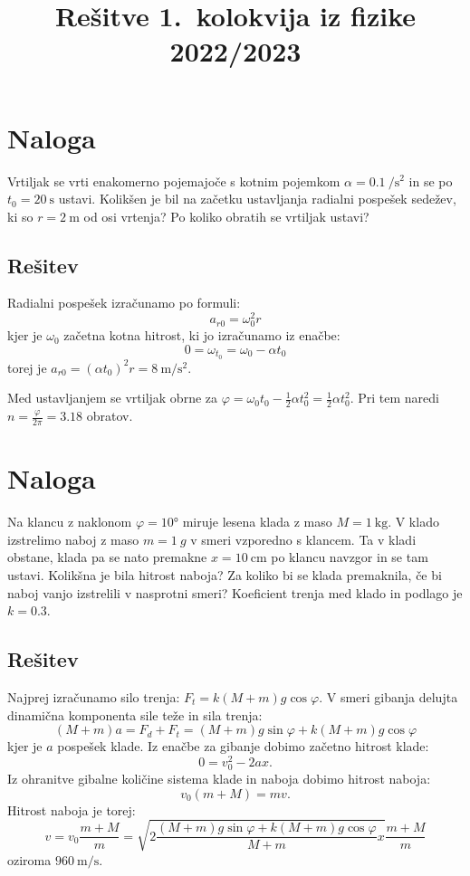 \documentclass[a4,11pt]{article}
\title{Rešitve 1.~kolokvija iz fizike 2022/2023}
\author{}
\date{}
\begin{document}
\maketitle

\section{Naloga}
    Vrtiljak se vrti enakomerno pojemajoče s kotnim pojemkom \(\alpha = \qty{0.1}{\per\s\squared}\)
    in se po \(t_0 = \qty{20}{\s}\) ustavi.
    Kolikšen je bil na začetku ustavljanja radialni pospešek sedežev, ki so \(r = \qty{2}{\m}\) od osi vrtenja?
    Po koliko obratih se vrtiljak ustavi?

\subsection*{Rešitev}
    Radialni pospešek izračunamo po formuli:
    \[a_{r0} = \omega_0^2 r\]
    kjer je \(\omega_0\) začetna kotna hitrost, ki jo izračunamo iz enačbe:
    \[0 = \omega_{t_0} = \omega_0 - \alpha t_0\]
    torej je \(a_{r0} = {\left(\alpha t_0\right)}^2 r = \qty{8}{\m\per\s\squared}\).

    Med ustavljanjem se vrtiljak obrne za \(\varphi = \omega_0 t_0 - \frac{1}{2}\alpha t_0^2 = \frac{1}{2}\alpha t_0^2\).
    Pri tem naredi \(n = \frac{\varphi}{2\pi} = 3.18\) obratov.

\section{Naloga}
    Na klancu z naklonom \(\varphi = \ang{10}\) miruje lesena klada z maso \(M = \qty{1}{\kg}\). V klado izstrelimo naboj z maso
    \(m = \qty{1}{g}\) v smeri vzporedno s klancem. Ta v kladi obstane, klada pa se nato premakne \(x = \qty{10}{\cm}\)
    po klancu navzgor in se tam ustavi. Kolikšna je bila hitrost naboja? Za koliko bi se klada
    premaknila, če bi naboj vanjo izstrelili v nasprotni smeri? Koeficient trenja med klado in
    podlago je \(k = 0.3\).

\subsection*{Rešitev}
    Najprej izračunamo silo trenja: \(F_t = k(M + m)g\cos\varphi\).
    V smeri gibanja delujta dinamična komponenta sile teže in sila trenja:
    \[(M + m) a = F_d + F_t = (M + m)g\sin\varphi + k(M + m)g\cos\varphi\]
    kjer je \(a\) pospešek klade. Iz enačbe za gibanje dobimo začetno hitrost klade:
    \[0 = v_0^2 - 2ax.\]
    Iz ohranitve gibalne količine sistema klade in naboja dobimo hitrost naboja:
    \[v_0 (m + M) = m v.\]
    Hitrost naboja je torej:
    \[v = v_0 \frac{m + M}{m} = \sqrt{2\frac{(M + m)g\sin\varphi + k(M + m)g\cos\varphi}{M + m}x} \frac{m + M}{m}\]
    oziroma \(\qty{960}{\m\per\s}\).
\end{document}
